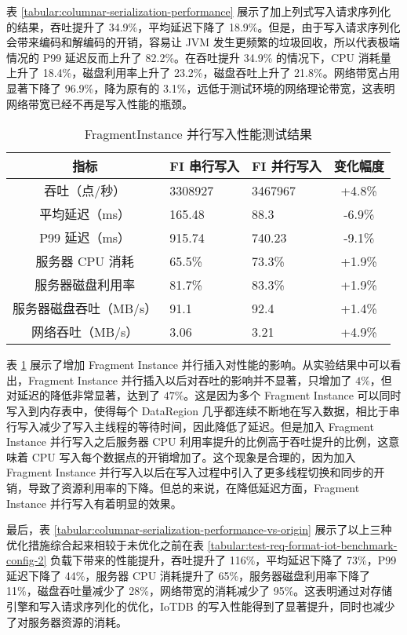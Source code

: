 表 \ref{tabular:columnar-serialization-performance} 展示了加上列式写入请求序列化的结果，吞吐提升了 34.9\%，平均延迟下降了 18.9\%。但是，由于写入请求序列化会带来编码和解编码的开销，容易让 JVM 发生更频繁的垃圾回收，所以代表极端情况的 P99 延迟反而上升了 82.2\%。在吞吐提升 34.9\% 的情况下，CPU 消耗量上升了 18.4\%，磁盘利用率上升了 23.2\%，磁盘吞吐上升了 21.8\%。网络带宽占用显著下降了 96.9\%，降为原有的 3.1\%，远低于测试环境的网络理论带宽，这表明网络带宽已经不再是写入性能的瓶颈。

\begin{table}
  \centering
  \caption{FragmentInstance 并行写入性能测试结果}
  \begin{tabular}{cp{3.5cm}p{3.5cm}c}
    \toprule 
    指标 &    FI 串行写入 &  FI 并行写入 & 变化幅度 \\
    \midrule  
    吞吐（点/秒） & 	3308927 & 3467967 & +4.8\%\\  
    平均延迟（ms） &  	165.48 & 88.3 & -6.9\%\\  
    P99 延迟（ms） & 	915.74 & 740.23 & -9.1\%\\  
    服务器 CPU 消耗 &  	65.5\% & 73.3\% & +1.9\%\\  
    服务器磁盘利用率 & 	81.7\% & 83.3\% & +1.9\%\\  
    服务器磁盘吞吐（MB/s） & 91.1 & 92.4 & +1.4\%\\  
    网络吞吐（MB/s） & 	3.06 & 3.21 & +4.9\%\\  
    \bottomrule
  \end{tabular}
  \label{tabular:fi-parallel-insert-performance}
\end{table}

表 \ref{tabular:fi-parallel-insert-performance} 展示了增加 Fragment Instance 并行插入对性能的影响。从实验结果中可以看出，Fragment Instance 并行插入以后对吞吐的影响并不显著，只增加了 $4\%$，但对延迟的降低非常显著，达到了 $47\%$。这是因为多个 Fragment Instance 可以同时写入到内存表中，使得每个 DataRegion 几乎都连续不断地在写入数据，相比于串行写入减少了写入主线程的等待时间，因此降低了延迟。但是加入 Fragment Instance 并行写入之后服务器 CPU 利用率提升的比例高于吞吐提升的比例，这意味着 CPU 写入每个数据点的开销增加了。这个现象是合理的，因为加入 Fragment Instance 并行写入以后在写入过程中引入了更多线程切换和同步的开销，导致了资源利用率的下降。但总的来说，在降低延迟方面，Fragment Instance 并行写入有着明显的效果。

最后，表 \ref{tabular:columnar-serialization-performance-vs-origin} 展示了以上三种优化措施综合起来相较于未优化之前在表 \ref{tabular:test-req-format-iot-benchmark-config-2} 负载下带来的性能提升，吞吐提升了 116\%，平均延迟下降了 73\%，P99 延迟下降了 44\%，服务器 CPU 消耗提升了 65\%，服务器磁盘利用率下降了 11\%，磁盘吞吐量减少了 28\%，网络带宽的消耗减少了 95\%。这表明通过对存储引擎和写入请求序列化的优化，IoTDB 的写入性能得到了显著提升，同时也减少了对服务器资源的消耗。

